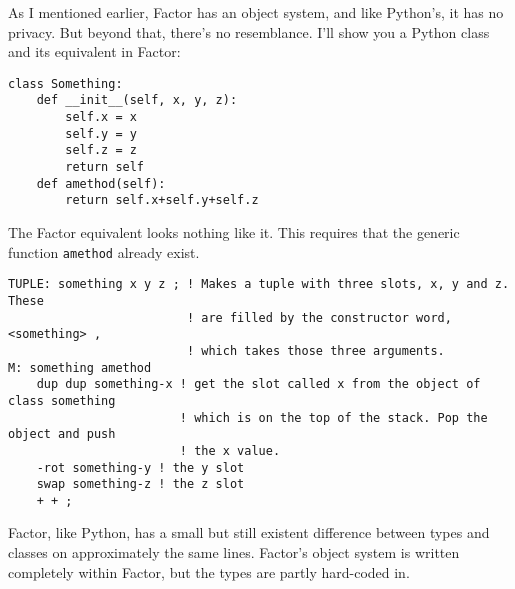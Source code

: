 \documentclass{article}
\begin{document}
As I mentioned earlier, Factor has an object system, and like Python's, it has no privacy. But beyond that, there's no resemblance. I'll show you a Python class and its equivalent in Factor:
\begin{verbatim}
class Something:
    def __init__(self, x, y, z):
        self.x = x
        self.y = y
        self.z = z
        return self
    def amethod(self):
        return self.x+self.y+self.z
\end{verbatim}
The Factor equivalent looks nothing like it. This requires that the generic function \texttt{amethod} already exist.
\begin{verbatim}
TUPLE: something x y z ; ! Makes a tuple with three slots, x, y and z. These
                         ! are filled by the constructor word, <something> ,
                         ! which takes those three arguments.
M: something amethod
    dup dup something-x ! get the slot called x from the object of class something
                        ! which is on the top of the stack. Pop the object and push
                        ! the x value.
    -rot something-y ! the y slot
    swap something-z ! the z slot
    + + ;
\end{verbatim}
Factor, like Python, has a small but still existent difference between types and classes on approximately the same lines. Factor's object system is written completely within Factor, but the types are partly hard-coded in.
\end{document}

